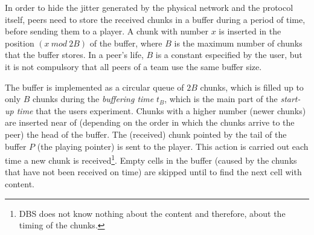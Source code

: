

\label{sec:buffering_chunks}

In order to hide the jitter generated by the physical network and the
protocol itself, peers need to store the received chunks in a buffer
during a period of time, before sending them to a player. A chunk with
number $x$ is inserted in the position $(x~\mathit{mod}~2B)$ of the
buffer, where $B$ is the maximum number of chunks that the buffer
stores. In a peer's life, $B$ is a constant especified by the user,
but it is not compulsory that all peers of a team use the same buffer
size.

The buffer is implemented as a circular queue of $2B$ chunks, which is
filled up to only $B$ chunks during the \emph{buffering time} $t_B$,
which is the main part of the \emph{start-up time} that the users
experiment. Chunks with a higher number (newer chunks) are inserted
near of (depending on the order in which the chunks arrive to the
peer) the head of the buffer. The (received) chunk pointed by the tail
of the buffer $P$ (the playing pointer) is sent to the player. This
action is carried out each time a new chunk is received\footnote{DBS
  does not know nothing about the content and therefore, about the
  timing of the chunks.}. Empty cells in the buffer (caused by the
chunks that have not been received on time) are skipped until to find
the next cell with content.

